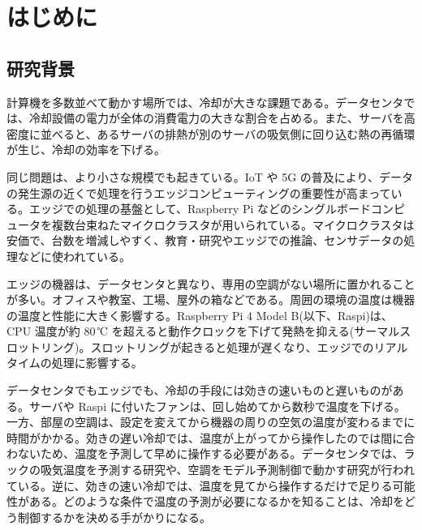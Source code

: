\chapter{はじめに}\label{chap:intro}

\section{研究背景}
計算機を多数並べて動かす場所では、冷却が大きな課題である。データセンタでは、冷却設備の電力が全体の消費電力の大きな割合を占める\cite{dayarathna2016energy}。また、サーバを高密度に並べると、あるサーバの排熱が別のサーバの吸気側に回り込む熱の再循環が生じ、冷却の効率を下げる\cite{moore2005cool,tang2008sensor}。

同じ問題は、より小さな規模でも起きている。IoT や 5G の普及により、データの発生源の近くで処理を行うエッジコンピューティングの重要性が高まっている\cite{shi2016edge}。エッジでの処理の基盤として、Raspberry Pi などのシングルボードコンピュータを複数台束ねたマイクロクラスタが用いられている\cite{iridispi2014}。マイクロクラスタは安価で、台数を増減しやすく、教育・研究やエッジでの推論、センサデータの処理などに使われている。

エッジの機器は、データセンタと異なり、専用の空調がない場所に置かれることが多い。オフィスや教室、工場、屋外の箱などである。周囲の環境の温度は機器の温度と性能に大きく影響する\cite{edgeengine2023}。Raspberry Pi 4 Model B(以下、Raspi)は、CPU 温度が約 80\,℃ を超えると動作クロックを下げて発熱を抑える(サーマルスロットリング)。スロットリングが起きると処理が遅くなり、エッジでのリアルタイムの処理に影響する。

データセンタでもエッジでも、冷却の手段には効きの速いものと遅いものがある。サーバや Raspi に付いたファンは、回し始めてから数秒で温度を下げる。一方、部屋の空調は、設定を変えてから機器の周りの空気の温度が変わるまでに時間がかかる。効きの遅い冷却では、温度が上がってから操作したのでは間に合わないため、温度を予測して早めに操作する必要がある。データセンタでは、ラックの吸気温度を予測する研究\cite{sasakura2020}や、空調をモデル予測制御で動かす研究\cite{ogura2018mpc}が行われている。逆に、効きの速い冷却では、温度を見てから操作するだけで足りる可能性がある。どのような条件で温度の予測が必要になるかを知ることは、冷却をどう制御するかを決める手がかりになる。

